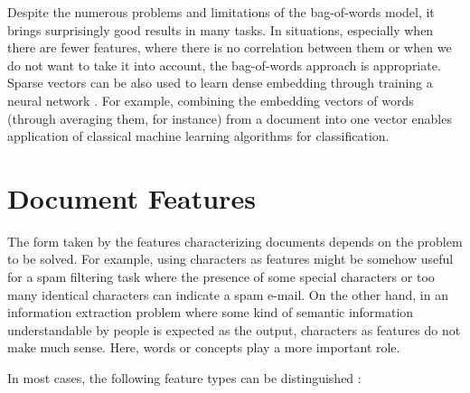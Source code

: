 \documentclass[11pt,openany,executivepaper]{book}
\begin{document}
Despite the numerous problems and limitations of the bag-of-words mo\-del, it brings surprisingly good results in many tasks. In situations, especially when there are fewer features, where there is no correlation between them or when we do not want to take it into account, the bag-of-words approach is appropriate. Sparse vectors can be also used to learn dense embedding through training a neural network \cite{101}. For example, combining the embedding vectors of words (through averaging them, for instance) from a document into one vector enables application of classical machine learning algorithms for classification.

\section{Document Features}
The form taken by the features characterizing documents depends on the problem to be solved. For example, using characters as features might be somehow useful for a spam filtering task where the presence of some special characters or too many identical characters can indicate a spam e-mail. On the other hand, in an information extraction problem where some kind of semantic information understandable by people is expected as the output, characters as features do not make much sense. Here, words or concepts play a more important role.

In most cases, the following feature types can be distinguished \cite{87}:
\end{document}
